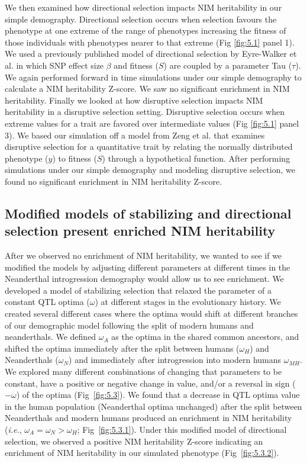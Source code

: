 We then examined how directional selection impacts NIM heritability in our simple demography. Directional selection occurs when selection favours the phenotype at one extreme of the range of phenotypes increasing the fitness of those individuals with phenotypes nearer to that extreme ({Fig \ref{fig:5.1} panel 1}). We used a previously published model of directional selection by Eyre-Walker et al. \cite{eyre2010genetic} in which SNP effect size $\beta$ and fitness ($S$) are coupled by a parameter Tau ($\tau$). We again performed forward in time simulations under our simple demography to calculate a NIM heritability Z-score. We saw no significant enrichment in NIM heritability.
Finally we looked at how disruptive selection impacts NIM heritability in a disruptive selection setting. Disruptive selection occurs when extreme values for a trait are favored over intermediate values ({Fig \ref{fig:5.1} panel 3}). We based our simulation off a model from Zeng et al. \cite{zeng2018signatures} that examines disruptive selection for a quantitative trait by relating the normally distributed phenotype ($y$) to fitness ($S$) through a hypothetical function. After performing simulations under our simple demography and modeling disruptive selection, we found no significant enrichment in NIM heritability Z-score. 
\subsection{Modified models of stabilizing and directional selection present enriched NIM heritability}
After we observed no enrichment of NIM heritability, we wanted to see if we modified the models by adjusting different parameters at different times in the Neanderthal introgression demography would allow us to see enrichment. We developed a model of stabilizing selection that relaxed the parameter of a constant QTL optima ($\omega$) at different stages in the evolutionary history. We created several different cases where the optima would shift at different branches of our demographic model following the split of modern humans and neanderthals. We defined $\omega_A$ as the optima in the shared common ancestors, and shifted the optima immediately after the split between humans ($\omega_H$) and Neanderthals ($\omega_{N}$) and immediately after introgression into modern humans $\omega_{MH}$. We explored many different combinations of changing that parameters to be constant, have a positive or negative change in value, and/or a reversal in sign ($-\omega$) of the optima ({Fig~\ref{fig:5.3}}). We found that a decrease in QTL optima value in the human population (Neanderthal optima unchanged) after the split between Neanderthals and modern humans produced an enrichment in NIM heritability (\emph{i.e.}, $\omega_A = \omega_N > \omega_H$; {Fig~\ref{fig:5.3.1}}). Under this modified model of directional selection, we observed a positive NIM heritability Z-score indicating an enrichment of NIM heritability in our simulated phenotype {(Fig~\ref{fig:5.3.2})}.

